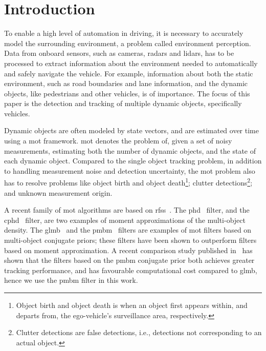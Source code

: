 \documentclass[conference]{IEEEtran}
\begin{document}
\IEEEpeerreviewmaketitle

\section{Introduction}


To enable a high level of automation in driving, it is necessary to accurately model the surrounding environment, a problem called environment perception.
Data from onboard sensors, such as cameras, radars and lidars, has to be processed to extract information about the environment needed to automatically and safely navigate the vehicle. For example, information about both the static environment, such as road boundaries and lane information, and the dynamic objects, like pedestrians and other vehicles, is of importance. The focus of this paper is the detection and tracking of multiple dynamic objects, specifically vehicles.

Dynamic objects are often modeled by state vectors, and are estimated over time using a \gls{mot} framework.
\Gls{mot} denotes the problem of, given a set of noisy measurements, estimating both the number of dynamic objects, and the state of each dynamic object.
Compared to the single object tracking problem, in addition to handling measurement noise and detection uncertainty, the \gls{mot} problem also has to resolve problems like object birth and object death\footnote{Object birth and object death is when an object first appears within, and departs from, the ego-vehicle's surveillance area, respectively.}; clutter detections\footnote{Clutter detections are false detections, i.e., detections not corresponding to an actual object.}; and unknown measurement origin.


A recent family of \gls{mot} algorithms are based on \glspl{rfs}~\cite{Mahler2007}.
The \gls{phd}~\cite{Mahler2003} filter, and the \gls{cphd}~\cite{Mahler2007b} filter, are two examples of moment approximations of the multi-object density.
The \gls{glmb}~\cite{Vo2013,Reuter2014} and the \gls{pmbm}~\cite{Williams2015,Garcia-Fernandez2017} filters are examples of \gls{mot} filters based on multi-object conjugate priors; these filters have been shown to outperform filters based on moment approximation. A recent comparison study published in~\cite{XiaGSGF:2017} has shown that the filters based on the \gls{pmbm} conjugate prior both achieves greater tracking performance, and has favourable computational cost compared to \gls{glmb}, hence we use the \gls{pmbm} filter in this work.
\end{document}
